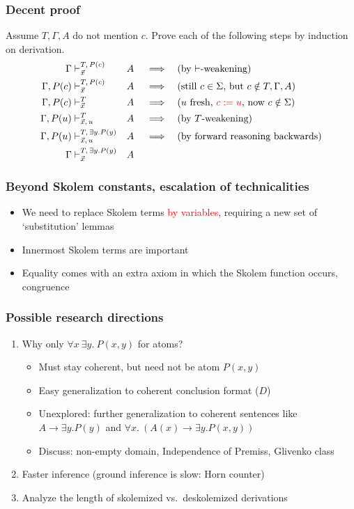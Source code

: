 \documentclass[handout,11pt,hyperref ={colorlinks = true, urlcolor = red}]{beamer}
\newcommand{\red}[1]{\textcolor{red}{#1}}
\begin{document}
\begin{frame}
\frametitle{Decent proof}
Assume $T,\Gamma,A$ do not mention $c$.
Prove each of the following steps by induction on derivation.
    \begin{alignat*}{4}
    \Gamma&\vdash_{\vec{x}}^{T,\,P(c)}&& A  && \implies &&
    \text{(by $\vdash$-weakening)} \\
    \Gamma,P(c)&\vdash_{\vec{x}}^{T,\,P(c)} && A && \implies &&
    \text{(still $c\in\Sigma$, but $c\notin T,\Gamma,A$)} \\
    \Gamma,P(c)&\vdash_{\vec{x}}^{T} && A && \implies &&
    \text{($u$ fresh, \red{$c:=u$}, now $c\notin \Sigma$)} \\
    \Gamma,P(u)&\vdash_{\vec{x},\,u}^{T} && A && \implies &&
    \text{(by $T$-weakening)} \\
    \Gamma,P(u)&\vdash_{\vec{x},\,u}^{T,\,\exists y.P(y)} && A && \implies &&
    \text{(by forward reasoning backwards)} \\
    \Gamma&\vdash_{\vec{x}}^{T,\,\exists y.P(y)} &&A %
    \end{alignat*}
\end{frame}

\begin{frame}
\frametitle{Beyond Skolem constants, escalation of technicalities}
 \begin{itemize}[<+->]
    \item We need to replace Skolem terms \red{by variables},
    requiring a new set of `substitution' lemmas
    \item Innermost Skolem terms are important
    \item Equality comes with an extra axiom in which the Skolem function
    occurs, congruence    
 \end{itemize}
\end{frame}

\begin{frame}
\frametitle{Possible research directions}
 \begin{enumerate}[<+->] 
    \item Why only $\forall{x}~\exists y.~P({x},y)$ for atoms?
    \begin{itemize}[<+->]
      \item Must stay coherent, but need not be atom $P({x},y)$
      \item Easy generalization to coherent conclusion format ($D$)
      \item Unexplored: further generalization to coherent sentences
      like $A \to \exists y. P(y)$ and
           $\forall x.~(A(x) \to \exists y. P(x,y))$
      \item Discuss: non-empty domain, Independence of Premiss, Glivenko class
    \end{itemize}
    \item Faster inference (ground inference is slow: Horn counter)
    \item Analyze the length of skolemized vs.\ deskolemized derivations
 \end{enumerate}
\end{frame}
\end{document}
